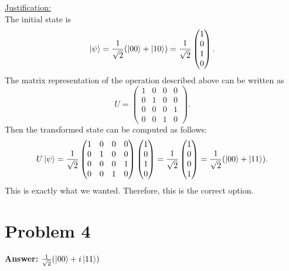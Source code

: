 \documentclass[11pt]{article}
\newcommand{\invroot}[1]{\frac{1}{\sqrt{#1}}}
\begin{document}
\uline{Justification:}\\
The initial state is
\begin{equation}
\ket{\psi}=\invroot{2}(\ket{00}+\ket{10})=\invroot{2}
  \begin{pmatrix}
    1\\
    0\\
    1\\
    0
  \end{pmatrix}.
\end{equation}
The matrix representation of the operation described above can be written as
\begin{equation}
U=\begin{pmatrix}
    1 & 0 & 0 & 0\\
    0 & 1 & 0 & 0\\
    0 & 0 & 0 & 1\\
    0 & 0 & 1 & 0
  \end{pmatrix}.
\end{equation}
Then the transformed state can be computed as follows:
\begin{equation}
U\ket{\psi}=\invroot{2}
  \begin{pmatrix}
    1 & 0 & 0 & 0\\
    0 & 1 & 0 & 0\\
    0 & 0 & 0 & 1\\
    0 & 0 & 1 & 0
  \end{pmatrix}
  \begin{pmatrix}
    1\\
    0\\
    1\\
    0
  \end{pmatrix}=\invroot{2}
  \begin{pmatrix}
    1\\
    0\\
    0\\
    1
  \end{pmatrix}=\invroot{2}(\ket{00}+\ket{11}).
\end{equation}
This is exactly what we wanted. Therefore, this is the correct option.
\section*{Problem 4}
\label{sec:org147b1f5}
\textbf{Answer:} \(\invroot{2}(\ket{00}+i\ket{11})\)\\
\end{document}
